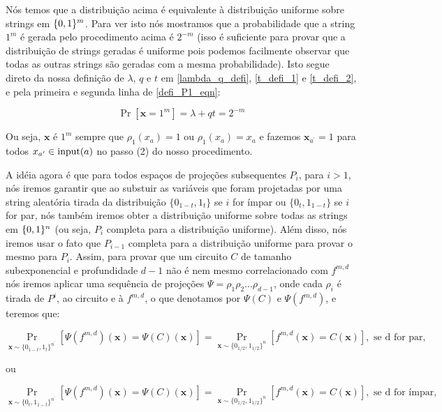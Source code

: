 Nós temos que a distribuição acima é equivalente à distribuição uniforme sobre strings em $\{0, 1\}^{m}$. Para ver isto nós mostramos que a probabilidade que a string $1^{m}$ é gerada pelo procedimento acima é $2^{-m}$ (isso é suficiente para provar que a distribuição de strings geradas é uniforme pois podemos facilmente observar que todas as outras strings são geradas com a mesma probabilidade). Isto segue direto da nossa definição de $\lambda$, $q$ e $t$ em \ref{lambda_q_defi}, \ref{t_defi_1} e \ref{t_defi_2}, e pela primeira e segunda linha de \ref{defi_P1_eqn}:

\begin{equation*}
	\Pr[\textbf{x} = 1^{m}]  = \lambda + qt = 2^{-m}
\end{equation*}

Ou seja, $\textbf{x}$ é $1^{m}$ sempre que $\rho_{1}(x_{a}) = 1$ ou $\rho_{1}(x_{a}) = x_{a}$ e fazemos $\textbf{x}_{a^{\prime}} = 1$ para todos $x_{a^{\prime}} \in \text{input}(a)$ no passo (2) do nosso procedimento.

A idéia agora é que para todos espaços de projeções subsequentes $P_{i}$, para $i > 1$, nós iremos garantir que ao substuir as variáveis que foram projetadas por uma string aleatória tirada da distribuição $\{0_{1 - t}, 1_{t}\}$ se $i$ for ímpar ou $\{0_{t}, 1_{1 - t}\}$ se $i$ for par, nós também iremos obter a distribuição uniforme sobre todas as strings em $\{0, 1\}^{n}$ (ou seja, $P_{i}$ completa para a distribuição uniforme). Além disso, nós iremos usar o fato que $P_{i - 1}$ completa para a distribuição uniforme para provar o mesmo para $P_{i}$. Assim, para provar que um circuito $C$ de tamanho subexponencial e profundidade $d - 1$ não é nem mesmo correlacionado com $f^{m, d}$ nós iremos aplicar uma sequência de projeções $\Psi = \rho_{1}\rho_{2}\dots\rho_{d - 1}$, onde cada $\rho_{i}$ é tirada de $P^{i}$, ao circuito e à $f^{m, d}$, o que denotamos por $\Psi(C)$ e $\Psi(f^{m, d})$, e teremos que:

\begin{equation*}
	\Pr_{\textbf{x} \sim \{0_{1 - t}, 1_{t}\}^{n^\prime}}[ \Psi(f^{m, d})(\textbf{x}) = \Psi(C)(\textbf{x})] = \Pr_{\textbf{x} \sim \{0_{1/2}, 1_{1/2}\}^{n}}[f^{m, d}(\textbf{x}) = C(\textbf{x})], \text{ se d for par},
\end{equation*}

ou

\begin{equation*}
	\Pr_{\textbf{x} \sim \{0_{t}, 1_{1 - t}\}^{n^{\prime}}}[ \Psi(f^{m, d})(\textbf{x}) = \Psi(C)(\textbf{x})] = \Pr_{\textbf{x} \sim \{0_{1/2}, 1_{1/2}\}^{n}}[f^{m, d}(\textbf{x}) = C(\textbf{x})], \text{ se d for ímpar},
\end{equation*}

